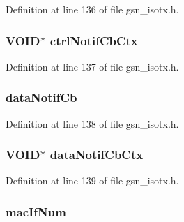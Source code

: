 Definition at line 136 of file gsn\_\-isotx.h.

\hypertarget{a00104_a6f33e042154bc2634628dd57ffde3e8d}{
\subsubsection[{ctrlNotifCbCtx}]{\setlength{\rightskip}{0pt plus 5cm}VOID$\ast$ {\bf ctrlNotifCbCtx}}}
\label{a00104_a6f33e042154bc2634628dd57ffde3e8d}


Definition at line 137 of file gsn\_\-isotx.h.

\hypertarget{a00104_a6f147a768d8d32582991e6f9126f2206}{
\subsubsection[{dataNotifCb}]{ {\bf dataNotifCb}}}
\label{a00104_a6f147a768d8d32582991e6f9126f2206}


Definition at line 138 of file gsn\_\-isotx.h.

\hypertarget{a00104_a1d09453c95fd5ccea2a75b244351d73b}{
\subsubsection[{dataNotifCbCtx}]{\setlength{\rightskip}{0pt plus 5cm}VOID$\ast$ {\bf dataNotifCbCtx}}}
\label{a00104_a1d09453c95fd5ccea2a75b244351d73b}


Definition at line 139 of file gsn\_\-isotx.h.

\hypertarget{a00104_ae57ae92e651751e7978e237c55133b4c}{
\subsubsection[{macIfNum}]{ {\bf macIfNum}}}
\label{a00104_ae57ae92e651751e7978e237c55133b4c}


